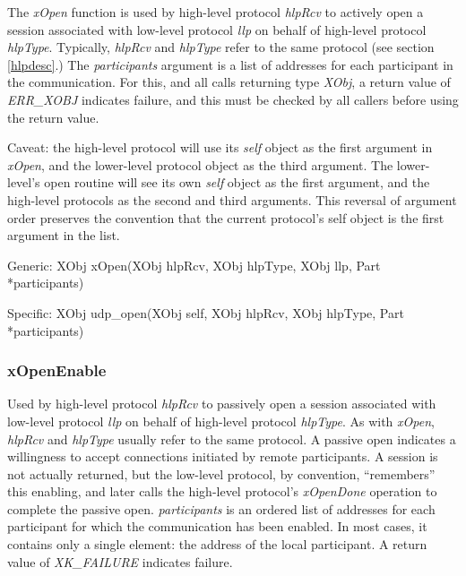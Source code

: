 \noindent The {\em xOpen} function is used by high-level protocol {\em
hlpRcv} to actively open a session associated with low-level protocol
{\em llp} on behalf of high-level protocol {\em hlpType}. Typically,
{\em hlpRcv} and {\em hlpType} refer to the same protocol 
(see section \ref{hlpdesc}.)  
The {\em participants} 
argument is a list of addresses for each participant in
the communication.  For this, and all calls returning type {\em XObj},
a return value of {\em ERR\_XOBJ} indicates failure, and this must be
checked by all callers before using the return value.

Caveat: the high-level protocol will use its {\em self} object as the
first argument in {\em xOpen}, and the lower-level protocol object as
the third argument.  The lower-level's open routine will see its own
{\em self} object as the first argument, and the high-level protocols
as the second and third arguments.  This reversal of argument order
preserves the convention that the current protocol's self object is
the first argument in the list.

\medskip
{\sanss Generic: }
{\sem XObj} {\bold xOpen}({\sem XObj} {\caps  hlpRcv}, {\sem XObj} {\caps  hlpType}, {\sem XObj} {\caps  llp}, {\sem Part} *{\caps participants})
\medskip

{\sanss Specific: }
{\sem XObj} {\bold udp\_open}({\sem XObj} {\caps self}, {\sem XObj} {\caps  hlpRcv}, {\sem XObj} {\caps  hlpType}, {\sem Part} *{\caps participants})

\subsubsection{xOpenEnable}

\noindent Used by high-level protocol {\em hlpRcv} to passively open a 
session associated with low-level protocol {\em llp} on behalf of
high-level protocol {\em hlpType}. As with {\em xOpen}, {\em hlpRcv}
and {\em hlpType} usually refer to the same protocol. A passive open
indicates a willingness to accept connections initiated by remote
participants.  A session is not actually returned, but the low-level
protocol, by convention, ``remembers'' this enabling, and later calls
the high-level protocol's {\em xOpenDone} operation to complete the
passive open.  {\em participants} is an ordered list of addresses for
each participant for which the communication has been enabled. In most
cases, it contains only a single element: the address of the local
participant.  A return value of {\em XK\_FAILURE} indicates failure.

